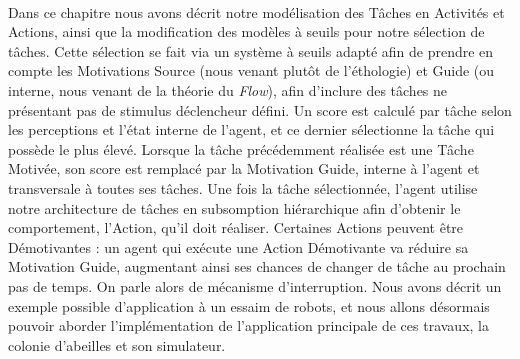 		\paragraph{}
		Dans ce chapitre nous avons décrit notre modélisation des Tâches en Activités et Actions, ainsi que la modification des modèles à seuils pour notre sélection de tâches. Cette sélection se fait via un système à seuils adapté afin de prendre en compte les Motivations Source (nous venant plutôt de l'éthologie) et Guide (ou interne, nous venant de la théorie du \textit{Flow}), afin d'inclure des tâches ne présentant pas de stimulus déclencheur défini. Un score est calculé par tâche selon les perceptions et l'état interne de l'agent, et ce dernier sélectionne la tâche qui possède le plus élevé. Lorsque la tâche précédemment réalisée est une Tâche Motivée, son score est remplacé par la Motivation Guide, interne à l'agent et transversale à toutes ses tâches. Une fois la tâche sélectionnée, l'agent utilise notre architecture de tâches en subsomption hiérarchique afin d'obtenir le comportement, l'Action, qu'il doit réaliser. Certaines Actions peuvent être Démotivantes : un agent qui exécute une Action Démotivante va réduire sa Motivation Guide, augmentant ainsi ses chances de changer de tâche au prochain pas de temps. On parle alors de mécanisme d'interruption. Nous avons décrit un exemple possible d'application à un essaim de robots, et nous allons désormais pouvoir aborder l'implémentation de l'application principale de ces travaux, la colonie d'abeilles et son simulateur.
